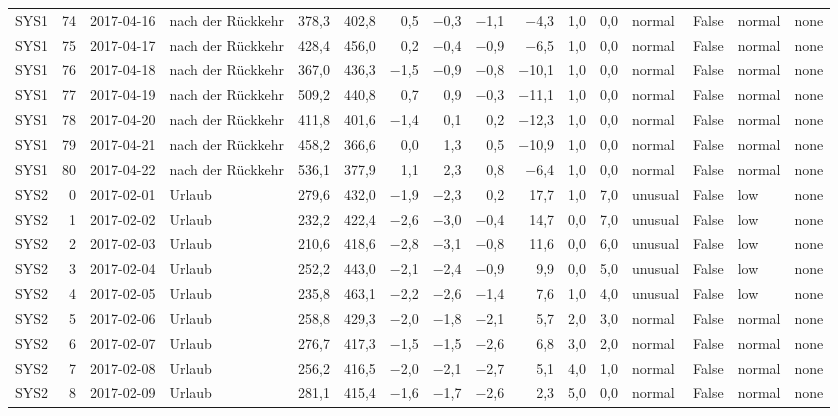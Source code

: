 \begin{tabular}{lrllrrrrrrrrlrll}
SYS1 & 74 & 2017-04-16 & nach der Rückkehr & 378,3 & 402,8 & 0,5 & $-$0,3 & $-$1,1 & $-$4,3 & 1,0 & 0,0 & normal & False & normal & none \\
SYS1 & 75 & 2017-04-17 & nach der Rückkehr & 428,4 & 456,0 & 0,2 & $-$0,4 & $-$0,9 & $-$6,5 & 1,0 & 0,0 & normal & False & normal & none \\
SYS1 & 76 & 2017-04-18 & nach der Rückkehr & 367,0 & 436,3 & $-$1,5 & $-$0,9 & $-$0,8 & $-$10,1 & 1,0 & 0,0 & normal & False & normal & none \\
SYS1 & 77 & 2017-04-19 & nach der Rückkehr & 509,2 & 440,8 & 0,7 & 0,9 & $-$0,3 & $-$11,1 & 1,0 & 0,0 & normal & False & normal & none \\
SYS1 & 78 & 2017-04-20 & nach der Rückkehr & 411,8 & 401,6 & $-$1,4 & 0,1 & 0,2 & $-$12,3 & 1,0 & 0,0 & normal & False & normal & none \\
SYS1 & 79 & 2017-04-21 & nach der Rückkehr & 458,2 & 366,6 & 0,0 & 1,3 & 0,5 & $-$10,9 & 1,0 & 0,0 & normal & False & normal & none \\
SYS1 & 80 & 2017-04-22 & nach der Rückkehr & 536,1 & 377,9 & 1,1 & 2,3 & 0,8 & $-$6,4 & 1,0 & 0,0 & normal & False & normal & none \\
SYS2 & 0 & 2017-02-01 & Urlaub & 279,6 & 432,0 & $-$1,9 & $-$2,3 & 0,2 & 17,7 & 1,0 & 7,0 & unusual & False & low & none \\
SYS2 & 1 & 2017-02-02 & Urlaub & 232,2 & 422,4 & $-$2,6 & $-$3,0 & $-$0,4 & 14,7 & 0,0 & 7,0 & unusual & False & low & none \\
SYS2 & 2 & 2017-02-03 & Urlaub & 210,6 & 418,6 & $-$2,8 & $-$3,1 & $-$0,8 & 11,6 & 0,0 & 6,0 & unusual & False & low & none \\
SYS2 & 3 & 2017-02-04 & Urlaub & 252,2 & 443,0 & $-$2,1 & $-$2,4 & $-$0,9 & 9,9 & 0,0 & 5,0 & unusual & False & low & none \\
SYS2 & 4 & 2017-02-05 & Urlaub & 235,8 & 463,1 & $-$2,2 & $-$2,6 & $-$1,4 & 7,6 & 1,0 & 4,0 & unusual & False & low & none \\
SYS2 & 5 & 2017-02-06 & Urlaub & 258,8 & 429,3 & $-$2,0 & $-$1,8 & $-$2,1 & 5,7 & 2,0 & 3,0 & normal & False & normal & none \\
SYS2 & 6 & 2017-02-07 & Urlaub & 276,7 & 417,3 & $-$1,5 & $-$1,5 & $-$2,6 & 6,8 & 3,0 & 2,0 & normal & False & normal & none \\
SYS2 & 7 & 2017-02-08 & Urlaub & 256,2 & 416,5 & $-$2,0 & $-$2,1 & $-$2,7 & 5,1 & 4,0 & 1,0 & normal & False & normal & none \\
SYS2 & 8 & 2017-02-09 & Urlaub & 281,1 & 415,4 & $-$1,6 & $-$1,7 & $-$2,6 & 2,3 & 5,0 & 0,0 & normal & False & normal & none \\

\end{tabular}
